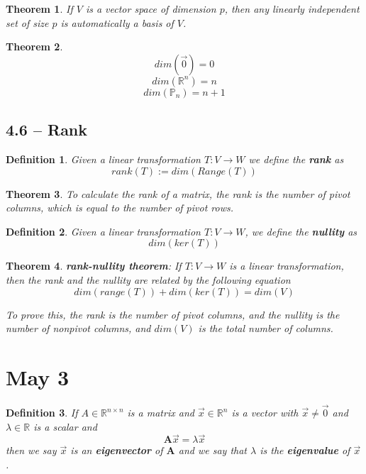 \documentclass[11pt]{article}
\newtheorem{thm}{Theorem}
\newtheorem{defn}{Definition}
\begin{document}
\begin{thm}
  If $V$ is a vector space of dimension $p$, then any linearly independent set of size $p$ is automatically a basis of $V$.
\end{thm}

\begin{thm}
  \[dim(\vec{0})=0\]
  \[dim(\mathbb{R}^{n})=n\]
  \[dim(\mathbb{P}_{n})=n+1\]
\end{thm}

\subsection{4.6 -- Rank}
\begin{defn}
  Given a linear transformation $T : V \to W$ we define the \textbf{rank} as
  \[rank(T) := dim(Range(T))\]
\end{defn}

\begin{thm}
  To calculate the rank of a matrix, the rank is the number of pivot columns,
  which is equal to the number of pivot rows.
\end{thm}

\begin{defn}
  Given a linear transformation $T: V \to W$, we define the \textbf{nullity} as
  \[dim(ker(T))\]
\end{defn}


\begin{thm}
  \textbf{rank-nullity theorem}: If $T : V \to W$ is a linear transformation, then the rank and the nullity
  are related by the following equation
  \[dim(range(T)) + dim(ker(T)) = dim(V)\]

  To prove this, the rank is the number of pivot columns, and the nullity is the number of nonpivot columns,
  and $dim(V)$ is the total number of columns.
\end{thm}
\section{May 3}

\begin{defn}
  If $A \in \mathbb{R}^{n \times n}$ is a matrix and $\vec{x} \in \mathbb{R}^{n}$ is a vector with $\vec{x} \neq \vec{0}$ and $\lambda \in \mathbb{R}$ is a scalar and
  \[\mathbf{A}\vec{x}=\lambda\vec{x}\]
  then we say $\vec{x}$ is an \textbf{eigenvector} of $\mathbf{A}$ and
  we say that $\lambda$ is the \textbf{eigenvalue} of $\vec{x}$.
\end{defn}
\end{document}
